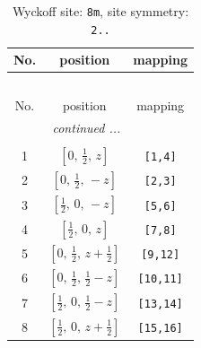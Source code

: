 \documentclass[fleqn,8pt]{jsarticle}
\begin{document}
\begin{longtable}{ccc}
\caption{Wyckoff site: {\tt 8m}, site symmetry: {\tt 2..}}
 \\
 \hline \hline
No. & position & mapping \\ \hline \endfirsthead

\multicolumn{2}{l}{\tablename\ \thetable{}} \\
 \hline \hline
No. & position & mapping \\ \hline \endhead

 \hline \hline
\multicolumn{2}{r}{\footnotesize\it continued ...} \\ \endfoot

 \hline \hline
\multicolumn{2}{r}{} \\ \endlastfoot

1 & $\left[ 0,\, \frac{1}{2},\, z \right]$ & {\tt [1,4]} \\ \hline
2 & $\left[ 0,\, \frac{1}{2},\, - z \right]$ & {\tt [2,3]} \\ \hline
3 & $\left[ \frac{1}{2},\, 0,\, - z \right]$ & {\tt [5,6]} \\ \hline
4 & $\left[ \frac{1}{2},\, 0,\, z \right]$ & {\tt [7,8]} \\ \hline
5 & $\left[ 0,\, \frac{1}{2},\, z + \frac{1}{2} \right]$ & {\tt [9,12]} \\ \hline
6 & $\left[ 0,\, \frac{1}{2},\, \frac{1}{2} - z \right]$ & {\tt [10,11]} \\ \hline
7 & $\left[ \frac{1}{2},\, 0,\, \frac{1}{2} - z \right]$ & {\tt [13,14]} \\ \hline
8 & $\left[ \frac{1}{2},\, 0,\, z + \frac{1}{2} \right]$ & {\tt [15,16]} \\
\end{longtable}
\renewcommand{\arraystretch}{1.2}
\end{document}
